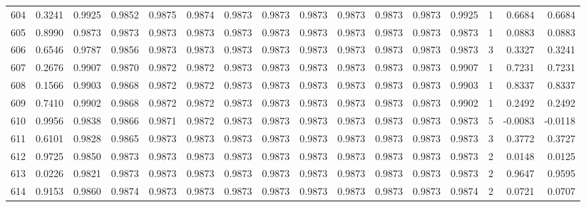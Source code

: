 \begin{tabular}{lrrrrrrrrrrrrrrr}
604 &      0.3241 &  0.9925 &  0.9852 &  0.9875 &  0.9874 &  0.9873 &  0.9873 &  0.9873 &  0.9873 &  0.9873 &   0.9873 &     0.9925 &      1 &                    0.6684 &                     0.6684 \\
605 &      0.8990 &  0.9873 &  0.9873 &  0.9873 &  0.9873 &  0.9873 &  0.9873 &  0.9873 &  0.9873 &  0.9873 &   0.9873 &     0.9873 &      1 &                    0.0883 &                     0.0883 \\
606 &      0.6546 &  0.9787 &  0.9856 &  0.9873 &  0.9873 &  0.9873 &  0.9873 &  0.9873 &  0.9873 &  0.9873 &   0.9873 &     0.9873 &      3 &                    0.3327 &                     0.3241 \\
607 &      0.2676 &  0.9907 &  0.9870 &  0.9872 &  0.9872 &  0.9873 &  0.9873 &  0.9873 &  0.9873 &  0.9873 &   0.9873 &     0.9907 &      1 &                    0.7231 &                     0.7231 \\
608 &      0.1566 &  0.9903 &  0.9868 &  0.9872 &  0.9872 &  0.9873 &  0.9873 &  0.9873 &  0.9873 &  0.9873 &   0.9873 &     0.9903 &      1 &                    0.8337 &                     0.8337 \\
609 &      0.7410 &  0.9902 &  0.9868 &  0.9872 &  0.9872 &  0.9873 &  0.9873 &  0.9873 &  0.9873 &  0.9873 &   0.9873 &     0.9902 &      1 &                    0.2492 &                     0.2492 \\
610 &      0.9956 &  0.9838 &  0.9866 &  0.9871 &  0.9872 &  0.9873 &  0.9873 &  0.9873 &  0.9873 &  0.9873 &   0.9873 &     0.9873 &      5 &                   -0.0083 &                    -0.0118 \\
611 &      0.6101 &  0.9828 &  0.9865 &  0.9873 &  0.9873 &  0.9873 &  0.9873 &  0.9873 &  0.9873 &  0.9873 &   0.9873 &     0.9873 &      3 &                    0.3772 &                     0.3727 \\
612 &      0.9725 &  0.9850 &  0.9873 &  0.9873 &  0.9873 &  0.9873 &  0.9873 &  0.9873 &  0.9873 &  0.9873 &   0.9873 &     0.9873 &      2 &                    0.0148 &                     0.0125 \\
613 &      0.0226 &  0.9821 &  0.9873 &  0.9873 &  0.9873 &  0.9873 &  0.9873 &  0.9873 &  0.9873 &  0.9873 &   0.9873 &     0.9873 &      2 &                    0.9647 &                     0.9595 \\
614 &      0.9153 &  0.9860 &  0.9874 &  0.9873 &  0.9873 &  0.9873 &  0.9873 &  0.9873 &  0.9873 &  0.9873 &   0.9873 &     0.9874 &      2 &                    0.0721 &                     0.0707 \\

\end{tabular}
